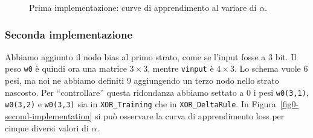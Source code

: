 \documentclass[a4paper,12pt]{article}
\begin{document}
\begin{figure}[htb]
    \centering
    \caption{Prima implementazione: curve di apprendimento al variare di $\alpha$.}
    \label{fig0-first-implementation}
\end{figure}

\subsubsection{Seconda implementazione}
Abbiamo aggiunto il nodo bias al primo strato, come se l'input fosse a 3 bit. Il peso \texttt{w0} è quindi ora una matrice $3\times 3$, mentre \texttt{vinput} è $4\times 3$. Lo schema vuole 6 pesi, ma noi ne abbiamo definiti 9 aggiungendo un terzo nodo nello strato nascosto. Per ``controllare'' questa ridondanza abbiamo settato a 0 i pesi \texttt{w0(3,1)}, \texttt{w0(3,2)} e \texttt{w0(3,3)} sia in \texttt{XOR\_Training} che in \texttt{XOR\_DeltaRule}. In Figura~\vref{fig0-second-implementation} si può osservare la curva di apprendimento loss per cinque diversi valori di $\alpha$.
\end{document}
